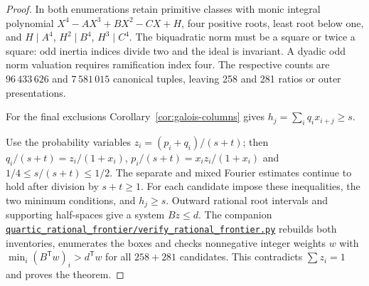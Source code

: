 \documentclass[11pt,reqno]{amsart}
\newcommand{\codefile}[1]{\href{https://github.com/sebastienpalcoux/grothendieck-ring-classification/blob/d5750105bb5758f3ad38d2e5464dfcc12c019816/supplements/rank6/sphericality/#1}{\nolinkurl{#1}}}
\theoremstyle{remark}\newtheorem{remark}[theorem]{Remark}
\numberwithin{equation}{section}
\begin{document}
\begin{proof}
In both enumerations retain primitive classes with monic integral
polynomial $X^4-AX^3+BX^2-CX+H$, four positive roots, least root
below one, and $H\mid A^4$, $H^2\mid B^4$, $H^3\mid C^4$. The
biquadratic norm must be a square or twice a square: odd inertia
indices divide two and the ideal is invariant. A dyadic odd norm
valuation requires ramification index four. The respective counts
are $96\,433\,626$ and $7\,581\,015$ canonical tuples, leaving 258
and 281 ratios or outer presentations.

For the final exclusions Corollary~\ref{cor:galois-columns} gives
$h_j=\sum_i q_i x_{i+j}\ge s$.

Use the probability variables $z_i=(p_i+q_i)/(s+t)$; then
$q_i/(s+t)=z_i/(1+x_i)$, $p_i/(s+t)=x_i z_i/(1+x_i)$ and
$1/4\le s/(s+t)\le1/2$. The separate and mixed Fourier estimates
continue to hold after division by $s+t\ge1$. For each candidate
impose these inequalities, the two minimum conditions, and
$h_j\ge s$. Outward rational root intervals and supporting
half-spaces give a system $Bz\le d$. The companion
\codefile{quartic_rational_frontier/verify_rational_frontier.py} rebuilds both inventories,
enumerates the boxes and checks nonnegative integer weights $w$
with $\min_i(B^{\mathsf T}w)_i>d^{\mathsf T}w$ for all $258+281$
candidates. This contradicts $\sum z_i=1$ and proves the theorem.
\end{proof}
\end{document}
